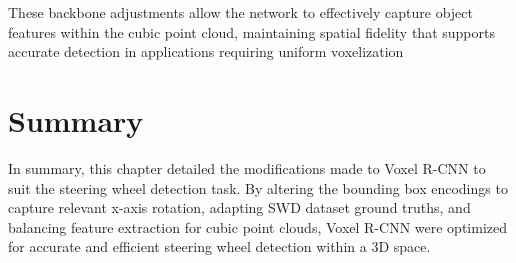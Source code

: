 These backbone adjustments allow the network to effectively capture object features within the cubic point cloud, maintaining spatial fidelity that supports accurate detection in applications requiring uniform voxelization

\section{Summary}
In summary, this chapter detailed the modifications made to Voxel R-CNN to suit the steering wheel detection task. By altering the bounding box encodings to capture relevant x-axis rotation, adapting SWD dataset ground truths, and balancing feature extraction for cubic point clouds, Voxel R-CNN were optimized for accurate and efficient steering wheel detection within a 3D space.